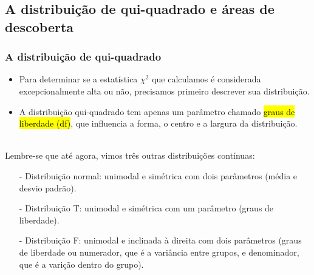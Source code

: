 
\subsection{A distribuição de qui-quadrado e áreas de descoberta}


\begin{frame}
\frametitle{A distribuição de qui-quadrado}

\begin{itemize}
\justifying
\item Para determinar se a estatística $\chi^2$ que calculamos é considerada excepcionalmente alta ou não, precisamos primeiro descrever sua distribuição.

\pause
\justifying
\item A distribuição qui-quadrado tem apenas um parâmetro chamado \hl {graus de liberdade (df)}, que influencia a forma, o centro e a largura da distribuição. \\

\end{itemize}

\pause

$\:$ \\
\justifying
{}
Lembre-se que até agora, vimos três outras distribuições contínuas:
\begin{itemize}
\justifying
\item[-] Distribuição normal: unimodal e simétrica com dois parâmetros (média e desvio padrão).
\justifying
\item[-] Distribuição T: unimodal e simétrica com um parâmetro (graus de liberdade).
\justifying
\item[-] Distribuição F: unimodal e inclinada à direita com dois parâmetros (graus de liberdade ou numerador, que é a variância entre grupos, e denominador, que é a varição dentro do grupo).
\end{itemize}


\end{frame}


